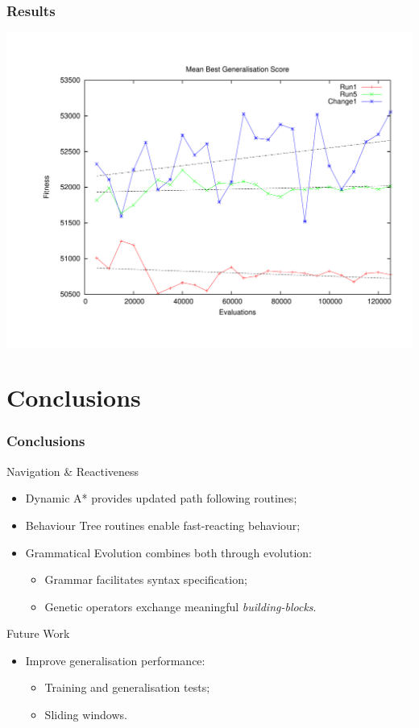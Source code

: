 \documentclass{beamer}
\begin{document}
\begin{frame}
	\frametitle{Results}
	\begin{center}
		\includegraphics[width=.75\paperwidth]{mbg}
	\end{center}
	\vfill
\end{frame}


\section{Conclusions}

\begin{frame}
	\frametitle{Conclusions}
	\begin{block}{Navigation \& Reactiveness}
		\begin{itemize}
			\item Dynamic A* provides updated path following routines;
			\item Behaviour Tree routines enable fast-reacting behaviour;
			\item Grammatical Evolution combines both through evolution:
			\begin{itemize}
				\item Grammar facilitates syntax specification;
				\item Genetic operators exchange meaningful \textit{building-blocks}.
			\end{itemize}
		\end{itemize}
	\end{block}
	\begin{block}{Future Work}
		\begin{itemize}
			\item Improve generalisation performance:
			\begin{itemize}
				\item Training and generalisation tests;
				\item Sliding windows.
			\end{itemize}
		\end{itemize}
	\end{block}
	\vfill
\end{frame}
\end{document}
